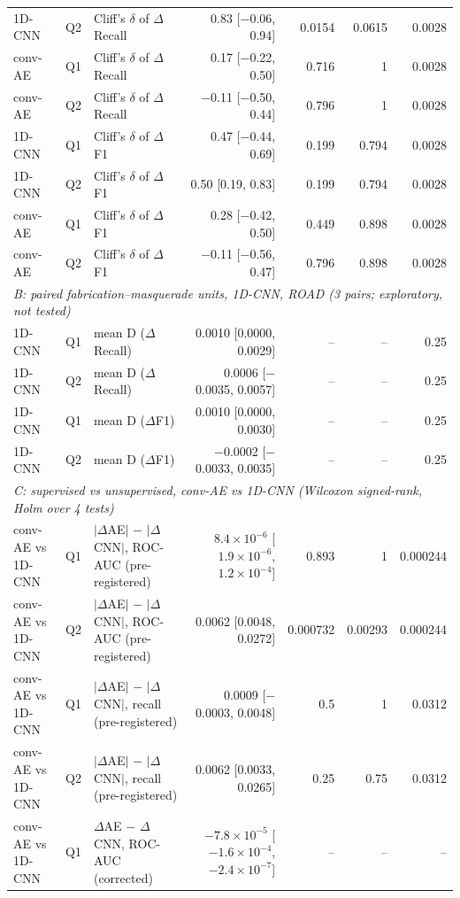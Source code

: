 \begin{table}[t]
\begin{tabular}{@{}lllrrrr@{}}
1D-CNN & Q2 & Cliff's $\delta$ of $\Delta$Recall & 0.83 [$-$0.06, 0.94] & 0.0154 & 0.0615 & 0.0028 \\
conv-AE & Q1 & Cliff's $\delta$ of $\Delta$Recall & 0.17 [$-$0.22, 0.50] & 0.716 & 1 & 0.0028 \\
conv-AE & Q2 & Cliff's $\delta$ of $\Delta$Recall & $-$0.11 [$-$0.50, 0.44] & 0.796 & 1 & 0.0028 \\
1D-CNN & Q1 & Cliff's $\delta$ of $\Delta$F1 & 0.47 [$-$0.44, 0.69] & 0.199 & 0.794 & 0.0028 \\
1D-CNN & Q2 & Cliff's $\delta$ of $\Delta$F1 & 0.50 [0.19, 0.83] & 0.199 & 0.794 & 0.0028 \\
conv-AE & Q1 & Cliff's $\delta$ of $\Delta$F1 & 0.28 [$-$0.42, 0.50] & 0.449 & 0.898 & 0.0028 \\
conv-AE & Q2 & Cliff's $\delta$ of $\Delta$F1 & $-$0.11 [$-$0.56, 0.47] & 0.796 & 0.898 & 0.0028 \\
\midrule
\multicolumn{7}{l}{\textit{B: paired fabrication--masquerade units, 1D-CNN, ROAD (3 pairs; exploratory, not tested)}} \\
1D-CNN & Q1 & mean D ($\Delta$Recall) & 0.0010 [0.0000, 0.0029] & -- & -- & 0.25 \\
1D-CNN & Q2 & mean D ($\Delta$Recall) & 0.0006 [$-$0.0035, 0.0057] & -- & -- & 0.25 \\
1D-CNN & Q1 & mean D ($\Delta$F1) & 0.0010 [0.0000, 0.0030] & -- & -- & 0.25 \\
1D-CNN & Q2 & mean D ($\Delta$F1) & $-$0.0002 [$-$0.0033, 0.0035] & -- & -- & 0.25 \\
\midrule
\multicolumn{7}{l}{\textit{C: supervised vs unsupervised, conv-AE vs 1D-CNN (Wilcoxon signed-rank, Holm over 4 tests)}} \\
conv-AE vs 1D-CNN & Q1 & $|\Delta$AE$|$ $-$ $|\Delta$CNN$|$, ROC-AUC (pre-registered) & $8.4\times10^{-6}$ [$1.9\times10^{-6}$, $1.2\times10^{-4}$] & 0.893 & 1 & 0.000244 \\
conv-AE vs 1D-CNN & Q2 & $|\Delta$AE$|$ $-$ $|\Delta$CNN$|$, ROC-AUC (pre-registered) & 0.0062 [0.0048, 0.0272] & 0.000732 & 0.00293 & 0.000244 \\
conv-AE vs 1D-CNN & Q1 & $|\Delta$AE$|$ $-$ $|\Delta$CNN$|$, recall (pre-registered) & 0.0009 [$-$0.0003, 0.0048] & 0.5 & 1 & 0.0312 \\
conv-AE vs 1D-CNN & Q2 & $|\Delta$AE$|$ $-$ $|\Delta$CNN$|$, recall (pre-registered) & 0.0062 [0.0033, 0.0265] & 0.25 & 0.75 & 0.0312 \\
conv-AE vs 1D-CNN & Q1 & $\Delta$AE $-$ $\Delta$CNN, ROC-AUC (corrected) & $-7.8\times10^{-5}$ [$-1.6\times10^{-4}$, $-2.4\times10^{-7}$] & -- & -- & -- \\

\end{tabular}
\end{table}
